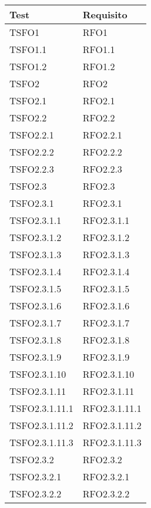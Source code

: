 			\begin{center}
   			\begin{longtable}{ | >{\centering\arraybackslash}m{5cm} | >{\centering\arraybackslash}m{5cm} | }
        
        	\hline
        		\textbf{Test} & \textbf{Requisito} \\ \hline
        	\endhead	
        		TSFO1 & RFO1 \\ \hline      		
				TSFO1.1	& RFO1.1 \\ \hline	
				TSFO1.2 & RFO1.2 \\ \hline	
				TSFO2 & RFO2 \\ \hline
				TSFO2.1 & RFO2.1 \\ \hline
				TSFO2.2 & RFO2.2 \\ \hline
				TSFO2.2.1 & RFO2.2.1 \\ \hline
				TSFO2.2.2 & RFO2.2.2 \\ \hline
				TSFO2.2.3 & RFO2.2.3 \\ \hline
				TSFO2.3 & RFO2.3 \\ \hline
				TSFO2.3.1 & RFO2.3.1 \\ \hline
				TSFO2.3.1.1 & RFO2.3.1.1 \\ \hline
				TSFO2.3.1.2 & RFO2.3.1.2 \\ \hline
				TSFO2.3.1.3 & RFO2.3.1.3 \\ \hline
				TSFO2.3.1.4 & RFO2.3.1.4 \\ \hline
				TSFO2.3.1.5 & RFO2.3.1.5 \\ \hline
				TSFO2.3.1.6 & RFO2.3.1.6 \\ \hline
				TSFO2.3.1.7 & RFO2.3.1.7 \\ \hline
				TSFO2.3.1.8 & RFO2.3.1.8 \\ \hline
				TSFO2.3.1.9 & RFO2.3.1.9 \\ \hline
				TSFO2.3.1.10 & RFO2.3.1.10 \\ \hline
				TSFO2.3.1.11 & RFO2.3.1.11 \\ \hline
				TSFO2.3.1.11.1 & RFO2.3.1.11.1 \\ \hline
				TSFO2.3.1.11.2 & RFO2.3.1.11.2 \\ \hline
				TSFO2.3.1.11.3 & RFO2.3.1.11.3 \\ \hline
				TSFO2.3.2 & RFO2.3.2 \\ \hline
				TSFO2.3.2.1 & RFO2.3.2.1 \\ \hline
				TSFO2.3.2.2 & RFO2.3.2.2 \\ \hline

\end{longtable}
\end{center}
